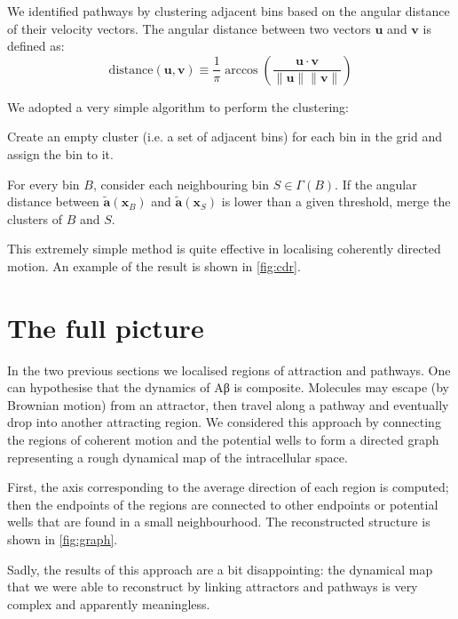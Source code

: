 We identified pathways by clustering adjacent bins based on the angular distance of their  velocity vectors. The angular distance between two vectors $\bm{u}$ and $\bm{v}$ is defined as:
\begin{equation} \label{eq:angular-similarity}
 \mathrm{distance}(\bm{u}, \bm{v}) \equiv \frac{1}{\pi} \arccos\left(\frac{\bm{u} \cdot \bm{v}}{\|\bm{u}\| \|\bm{v}\|}\right)
\end{equation}

\noindent We adopted a very simple algorithm to perform the clustering:
\begin{enumerate}
 \begin{item}
       Create an empty cluster (i.e. a set of adjacent bins) for each bin in the grid and assign the bin to it.
\end{item}
\begin{item}
      For every bin $B$, consider each neighbouring bin $S \in \Gamma(B)$. If the angular distance between $\tilde{\bm{a}}(\bm{x}_B)$ and $\tilde{\bm{a}}(\bm{x}_S)$ is lower than a given threshold, merge the clusters of $B$ and $S$.
\end{item}
\end{enumerate}

\noindent This extremely simple method is quite effective in localising coherently directed motion. An example of the result is shown in \cref{fig:cdr}.


\section{The full picture}\label{sec:full_picture}

In the two previous sections we localised regions of attraction and pathways. One can hypothesise that the dynamics of Aβ is composite. Molecules may escape (by Brownian motion) from an attractor, then travel along a pathway and eventually drop into another attracting region. We considered this approach by connecting the regions of coherent motion and the potential wells to form a directed graph representing a rough dynamical map of the intracellular space.

First, the axis corresponding to the average direction of each region is computed; then the endpoints of the regions are connected to other endpoints or potential wells that are found in a small neighbourhood. The reconstructed structure is shown in \cref{fig:graph}.

Sadly, the results of this approach are a bit disappointing: the dynamical map that we were able to reconstruct by linking attractors and pathways is very complex and apparently meaningless.

